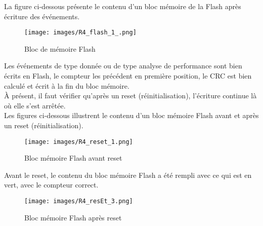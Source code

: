 \documentclass[a4paper, 12pt]{report}
\begin{document}
    La figure ci-dessous présente le contenu d'un bloc mémoire de la Flash après écriture des événements.
    \begin{figure}[H]
            \centering 
            \texttt{[image: images/R4\_flash\_1\_.png]}
            \caption{Bloc de mémoire Flash}
            \label{fig:diagExempleL1}
    \end{figure}

Les événements de type donnée ou de type analyse de performance sont bien écrits en Flash, le compteur les précédent en première position, le CRC est bien calculé et écrit à la fin du bloc mémoire.
\\

    À présent, il faut vérifier qu'après un reset (réinitialisation), l'écriture continue là où elle s'est arrêtée.\\


Les figures ci-dessous illustrent le contenu d'un bloc mémoire Flash avant et après un reset (réinitialisation).
    \begin{figure}[H] 
            \centering
            \texttt{[image: images/R4\_reset\_1.png]}
            \caption{Bloc mémoire Flash avant reset}
    \end{figure}

Avant le reset, le contenu du bloc mémoire Flash a été rempli avec ce qui est en vert, avec le compteur correct.

        \begin{figure}[H] 
            \centering
            \texttt{[image: images/R4\_resEt\_3.png]}
            \caption{Bloc mémoire Flash après reset}
    \end{figure}

\end{document}
